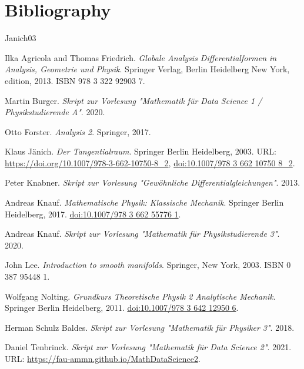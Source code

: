 \documentclass[letterpaper,10pt,english]{jupyterBook}
\begin{document}
\chapter{Bibliography}
\label{\detokenize{references:bibliography}}\label{\detokenize{references::doc}}
\par


\begin{sphinxthebibliography}{Janich03}
\par
Ilka Agricola and Thomas Friedrich. \emph{Globale Analysis   Differentialformen in Analysis, Geometrie und Physik}. Springer Verlag, Berlin Heidelberg New York, edition, 2013. ISBN 978 3 322 92903 7.
\par
Martin Burger. \emph{Skript zur Vorlesung "Mathematik für Data Science 1 / Physikstudierende A"}. 2020.
\par
Otto Forster. \emph{Analysis 2}. Springer, 2017.
\par
Klaus Jänich. \emph{Der Tangentialraum}. Springer Berlin Heidelberg, 2003. URL: \url{https://doi.org/10.1007/978-3-662-10750-8\_2}, \href{https://doi.org/10.1007/978-3-662-10750-8\_2}{doi:10.1007/978 3 662 10750 8\_2}.
\par
Peter Knabner. \emph{Skript zur Vorlesung "Gewöhnliche Differentialgleichungen"}. 2013.
\par
Andreas Knauf. \emph{Mathematische Physik: Klassische Mechanik}. Springer Berlin Heidelberg, 2017. \href{https://doi.org/10.1007/978-3-662-55776-1}{doi:10.1007/978 3 662 55776 1}.
\par
Andreas Knauf. \emph{Skript zur Vorlesung "Mathematik für Physikstudierende 3"}. 2020.
\par
John Lee. \emph{Introduction to smooth manifolds}. Springer, New York, 2003. ISBN 0 387 95448 1.
\par
Wolfgang Nolting. \emph{Grundkurs Theoretische Physik 2   Analytische Mechanik}. Springer Berlin Heidelberg, 2011. \href{https://doi.org/10.1007/978-3-642-12950-6}{doi:10.1007/978 3 642 12950 6}.
\par
Herman Schulz Baldes. \emph{Skript zur Vorlesung "Mathematik für Physiker 3"}. 2018.
\par
Daniel Tenbrinck. \emph{Skript zur Vorlesung "Mathematik für Data Science 2"}. 2021. URL: \url{https://fau-ammn.github.io/MathDataScience2}.
\end{sphinxthebibliography}






\renewcommand{\indexname}{Proof Index}


\renewcommand{\indexname}{Index}
\end{document}
